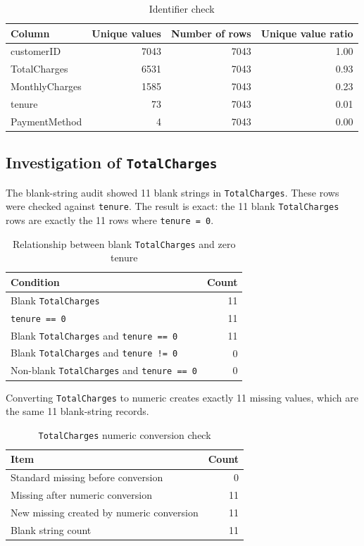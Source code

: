 \begin{table}[H]
\centering
\caption{Identifier check}
\label{tab:identifier-check}
\begin{tabular}{lrrr}
\toprule
Column & Unique values & Number of rows & Unique value ratio \\
\midrule
customerID & 7043 & 7043 & 1.00 \\
TotalCharges & 6531 & 7043 & 0.93 \\
MonthlyCharges & 1585 & 7043 & 0.23 \\
tenure & 73 & 7043 & 0.01 \\
PaymentMethod & 4 & 7043 & 0.00 \\
\bottomrule
\end{tabular}
\end{table}

\subsection{Investigation of \texttt{TotalCharges}}

The blank-string audit showed 11 blank strings in \texttt{TotalCharges}. These rows were checked against \texttt{tenure}. The result is exact: the 11 blank \texttt{TotalCharges} rows are exactly the 11 rows where \texttt{tenure = 0}.

\begin{table}[H]
\centering
\caption{Relationship between blank \texttt{TotalCharges} and zero tenure}
\label{tab:totalcharges-tenure}
\begin{tabular}{lr}
\toprule
Condition & Count \\
\midrule
Blank \texttt{TotalCharges} & 11 \\
\texttt{tenure == 0} & 11 \\
Blank \texttt{TotalCharges} and \texttt{tenure == 0} & 11 \\
Blank \texttt{TotalCharges} and \texttt{tenure != 0} & 0 \\
Non-blank \texttt{TotalCharges} and \texttt{tenure == 0} & 0 \\
\bottomrule
\end{tabular}
\end{table}

Converting \texttt{TotalCharges} to numeric creates exactly 11 missing values, which are the same 11 blank-string records.

\begin{table}[H]
\centering
\caption{\texttt{TotalCharges} numeric conversion check}
\label{tab:totalcharges-conversion}
\begin{tabular}{lr}
\toprule
Item & Count \\
\midrule
Standard missing before conversion & 0 \\
Missing after numeric conversion & 11 \\
New missing created by numeric conversion & 11 \\
Blank string count & 11 \\
\bottomrule
\end{tabular}
\end{table}


